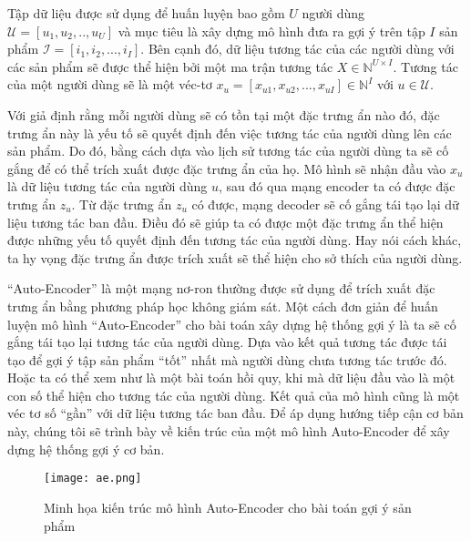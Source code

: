 

   Tập dữ liệu được sử dụng để huấn luyện bao gồm $U$ người dùng $\mathcal{U} = [u_1,u_2, .., u_U]$ và mục tiêu là xây dựng mô hình đưa ra gợi ý trên tập $I$ sản phẩm $\mathcal{I} = [i_1,i_2, ..., i_I]$. 
    Bên cạnh đó, dữ liệu tương tác của các người dùng với các sản phẩm sẽ được thể hiện bởi một ma trận tương tác $X \in \mathbb{N}^{U\times I}$. 
    Tương tác của một người dùng sẽ là một véc-tơ $x_u = [x_{u1}, x_{u2}, ..., x_{uI}] \in \mathbb{N}^I $ với $u \in \mathcal{U}$.
    
    Với giả định rằng mỗi người dùng sẽ có tồn tại một đặc trưng ẩn nào đó, đặc trưng ẩn này là yếu tố sẽ quyết định đến việc tương tác của người dùng lên các sản phẩm.
    Do đó, bằng cách dựa vào lịch sử tương tác của người dùng ta sẽ cố gắng để có thể trích xuất được đặc trưng ẩn của họ.
    Mô hình sẽ nhận đầu vào $x_u$ là dữ liệu tương tác của người dùng $u$, sau đó qua mạng encoder ta có được đặc trưng ẩn $z_u$.
    Từ đặc trưng ẩn $z_u$ có được, mạng decoder sẽ cố gắng tái tạo lại dữ liệu tương tác ban đầu.
    Điều đó sẽ giúp ta có được một đặc trưng ẩn thể hiện được những yếu tố quyết định đến tương tác của người dùng.
    Hay nói cách khác, ta hy vọng đặc trưng ẩn được trích xuất sẽ thể hiện cho sở thích của người dùng. 

    ``Auto-Encoder'' là một mạng nơ-ron thường được sử dụng để trích xuất đặc trưng ẩn bằng phương pháp học không giám sát.
    Một cách đơn giản để huấn luyện mô hình ``Auto-Encoder'' cho bài toán xây dựng hệ thống gợi ý là ta sẽ cố gắng tái tạo lại tương tác của người dùng.
    Dựa vào kết quả tương tác được tái tạo để gợi ý tập sản phẩm ``tốt'' nhất mà người dùng chưa tương tác trước đó. 
    Hoặc ta có thể xem như là một bài toán hồi quy, khi mà dữ liệu đầu vào là một con số thể hiện cho tương tác của người dùng.
    Kết quả của mô hình cũng là một véc tơ số ``gần'' với dữ liệu tương tác ban đầu.  
    Để áp dụng hướng tiếp cận cơ bản này, chúng tôi sẽ trình bày về kiến trúc của một mô hình Auto-Encoder để xây dựng hệ thống gợi ý cơ bản.
    \begin{figure}
        \centering
        \texttt{[image: ae.png]}
        \caption{Minh họa kiến trúc mô hình Auto-Encoder cho bài toán gợi ý sản phẩm}
        \label{fig_recae}
    \end{figure}

